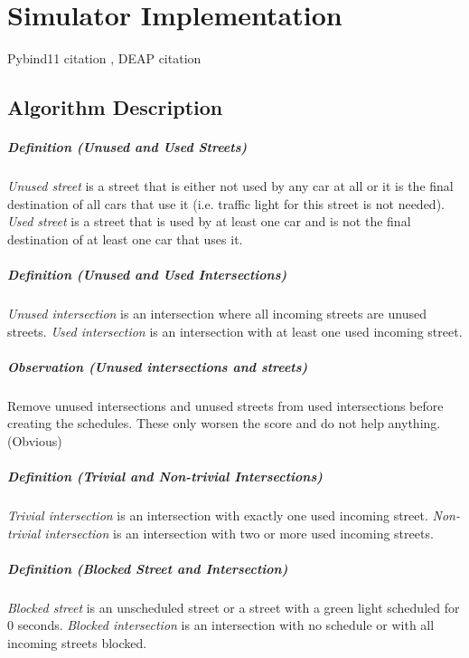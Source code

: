 \chapter{Simulator Implementation}

Pybind11 citation \cite{jakob2017pybind11}, DEAP citation \cite{fortin2012deap}

\section{Algorithm Description}

\paragraph{Definition (Unused and Used Streets)} \textit{Unused street} is a street that is either not used by any car at all or it is the final destination of all cars that use it (i.e. traffic light for this street is not needed). \textit{Used street} is a street that is used by at least one car and is not the final destination of at least one car that uses it.

\paragraph{Definition (Unused and Used Intersections)} \textit{Unused intersection} is an intersection where all incoming streets are unused streets. \textit{Used intersection} is an intersection with at least one used incoming street.

\paragraph{Observation (Unused intersections and streets)} Remove unused intersections and unused streets from used intersections before creating the schedules. These only worsen the score and do not help anything. (Obvious)

\paragraph{Definition (Trivial and Non-trivial Intersections)} \textit{Trivial intersection} is an intersection with exactly one used incoming street. \textit{Non-trivial intersection} is an intersection with two or more used incoming streets.

\paragraph{Definition (Blocked Street and Intersection)} \textit{Blocked street} is an unscheduled street or a street with a green light scheduled for 0 seconds. \textit{Blocked intersection} is an intersection with no schedule or with all incoming streets blocked.

